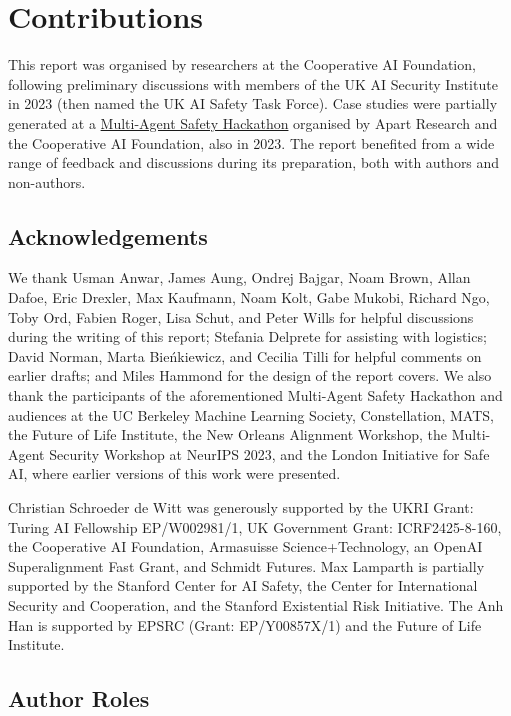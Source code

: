 \section{Contributions}
\label{app:contributions}

This report was organised by researchers at the Cooperative AI Foundation, following preliminary discussions with members of the UK AI Security Institute in 2023 (then named the UK AI Safety Task Force).
Case studies were partially generated at a \href{https://alignmentjam.com/jam/multiagent}{Multi-Agent Safety Hackathon} organised by Apart Research and the Cooperative AI Foundation, also in 2023.
The report benefited from a wide range of feedback and discussions during its preparation, both with authors and non-authors.

\subsection{Acknowledgements}


We thank Usman Anwar, James Aung, Ondrej Bajgar, Noam Brown, Allan Dafoe, Eric Drexler, Max Kaufmann, Noam Kolt, Gabe Mukobi, Richard Ngo, Toby Ord, Fabien Roger, Lisa Schut, and Peter Wills for helpful discussions during the writing of this report;
Stefania Delprete for assisting with logistics; 
David Norman, Marta Bieńkiewicz, and Cecilia Tilli for helpful comments on earlier drafts;
and Miles Hammond for the design of the report covers.
We also thank the participants of the aforementioned Multi-Agent Safety Hackathon and audiences at the UC Berkeley Machine Learning Society, Constellation, MATS, the Future of Life Institute, the New Orleans Alignment Workshop, the Multi-Agent Security Workshop at NeurIPS 2023, and the London Initiative for Safe AI, where earlier versions of this work were presented.

Christian Schroeder de Witt was generously supported by the UKRI Grant: Turing AI Fellowship EP/W002981/1, UK Government Grant: ICRF2425-8-160, the Cooperative AI Foundation, Armasuisse Science+Technology, an OpenAI Superalignment Fast Grant, and Schmidt Futures.
Max Lamparth is partially supported by the Stanford Center for AI Safety, the Center for International Security and Cooperation, and the Stanford Existential Risk Initiative.
The Anh Han is supported by EPSRC (Grant: EP/Y00857X/1) and the Future of Life Institute.  


\subsection{Author Roles}

